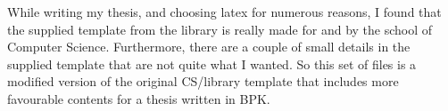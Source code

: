%
%



	While writing my thesis, and choosing latex for numerous reasons, I found that the supplied template from the library is really made for and by the school of Computer Science. Furthermore, there are a couple of small details in the supplied template that are not quite what I wanted. So this set of files is a modified version of the original CS/library template that includes more favourable contents for a thesis written in BPK.